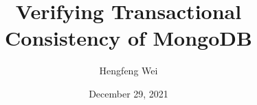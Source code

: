 \documentclass[]{beamer}
\title[MongoDB Transactions]{Verifying Transactional Consistency of MongoDB}
\subtitle{\teal{(submitted to VLDB'2022)}}
\author[Hengfeng Wei]{Hengfeng Wei}
\institute{hfwei@nju.edu.cn}
\date{December 29, 2021}
\begin{document}
\maketitle







\thankyou{}
\end{document}
